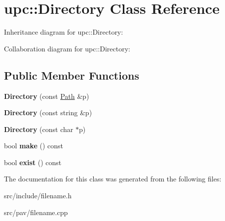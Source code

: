 \hypertarget{classupc_1_1Directory}{}\section{upc\+:\+:Directory Class Reference}
\label{classupc_1_1Directory}


Inheritance diagram for upc\+:\+:Directory\+:


Collaboration diagram for upc\+:\+:Directory\+:
\subsection*{Public Member Functions}
\begin{DoxyCompactItemize}
\item 
\mbox{\label{classupc_1_1Directory_a4b6321fb7644d3dcf225e2e666b837da}} 
{\bfseries Directory} (const \hyperlink{classupc_1_1Path}{Path} \&p)
\item 
\mbox{\label{classupc_1_1Directory_aca9acc226940f166429185989023727f}} 
{\bfseries Directory} (const string \&p)
\item 
\mbox{\label{classupc_1_1Directory_afb8c8e0bc50664d8505e0fa392f99657}} 
{\bfseries Directory} (const char $\ast$p)
\item 
\mbox{\label{classupc_1_1Directory_ac1ea823e51c240b8f90e6057f2694bd5}} 
bool {\bfseries make} () const
\item 
\mbox{\label{classupc_1_1Directory_a110a8b694850028b67a30167fd8bc575}} 
bool {\bfseries exist} () const
\end{DoxyCompactItemize}


The documentation for this class was generated from the following files\+:\begin{DoxyCompactItemize}
\item 
src/include/filename.\+h\item 
src/pav/filename.\+cpp\end{DoxyCompactItemize}
